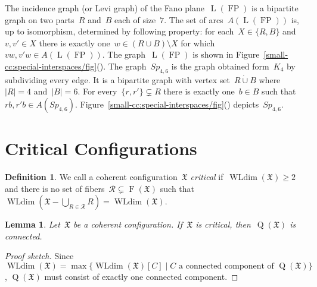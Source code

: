 \documentclass[english,a4paper]{article}
\theoremstyle{plain}
\newtheorem{lemma}      [theorem]{Lemma}
\theoremstyle{definition}
\newtheorem{definition} [theorem]{Definition}
\newcommand{\abs}[1]{| #1 |}
\newcommand{\disjointUnion}{\ensuremath{\mathbin{\dot{\cup}}}}
\DeclareMathOperator{\Fibers}{F}
\newcommand{\coherentConfig}{\ensuremath{\mathfrak{X}}}
\newcommand{\fibers}[1]{\ensuremath{\Fibers \left( #1 \right)}}
\newcommand{\arcs}{\ensuremath{A}}
\DeclareMathOperator*{\WLdim}{WLdim}
\newcommand{\wldim}[1]{\ensuremath{\WLdim\left(#1\right)}}
\DeclareMathOperator*{\Quotient}{Q}
\newcommand{\quotientGraph}[1]{\ensuremath{\Quotient(#1)}}
\DeclareMathOperator{\fanoPlane}{FP}
\DeclareMathOperator{\LeviGraph}{L}
\newcommand{\leviGraph}[1]{\ensuremath{\LeviGraph\!\left(#1\right)}}
\newcommand{\leviFano}{\leviGraph{\fanoPlane}}
\newcommand{\interspaceFourSix}{\ensuremath{Sp_{4,6}}}
\begin{document}
The incidence graph (or Levi graph) of the Fano plane~$\leviFano$ is a bipartite graph on two parts~$R$ and~$B$ each of size~$7$.
The set of arcs~$\arcs(\leviFano)$ is, up to isomorphism, determined by following property:
for each~$X \in \{R,B\}$ and~$v,v'\in X$ there is exactly one~$w \in (R \cup B) \setminus X$ for which~$vw,v'w \in \arcs(\leviFano)$.
The graph~$\leviFano$ is shown in Figure~\ref{small-cc:special-interspaces/fig}().
The graph~$\interspaceFourSix$ is the graph obtained form~$K_4$ by subdividing every edge.
It is a bipartite graph with vertex set~$R \disjointUnion B$ where~$\abs{R} = 4$ and~$\abs{B} = 6$.
For every~$\{r,r'\} \subsetneq R$ there is exactly one~$b \in B$ such that~$rb,r'b \in \arcs(\interspaceFourSix)$.
Figure~\ref{small-cc:special-interspaces/fig}() depicts~$\interspaceFourSix$.

 

\section{Critical Configurations}
\label{critical-graph/sec}

\begin{definition}
\label{def:critical-graph}
    We call a coherent configuration~$\coherentConfig$ \emph{critical} if~$\wldim{\coherentConfig}\geq 2$ and  there is no set of fibers~$\mathcal{R} \subsetneq \fibers{\coherentConfig}$ such that~$\wldim{\coherentConfig - \bigcup_{R \in \mathcal{R}} R} = \wldim{\coherentConfig}$.
\end{definition}


\begin{lemma}
\label{crictial:quotientGraph-connected/lem} \label{critical:disjoint-union/lem}
    Let~$\coherentConfig$ be a coherent configuration.
    If~$\coherentConfig$ is critical, then~$\quotientGraph{\coherentConfig}$ is connected.
\end{lemma}
\begin{proof}[Proof sketch]
    Since~$\wldim{\coherentConfig}= \max \{\wldim{\coherentConfig}[C]\mid  \text{$C$ a connected component of~$\quotientGraph{\coherentConfig}$}\}$, $\quotientGraph{\coherentConfig}$ must consist of exactly one connected component.
\end{proof}
\end{document}
